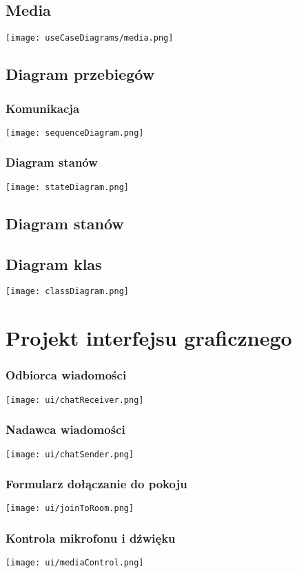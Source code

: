 \documentclass{article}
\begin{document}
\subsection{Media}
\texttt{[image: useCaseDiagrams/media.png]}

\subsection{Diagram przebiegów}
\subsubsection{Komunikacja}
\texttt{[image: sequenceDiagram.png]}

\subsubsection{Diagram stanów}
\texttt{[image: stateDiagram.png]}

\subsection{Diagram stanów}

\subsection{Diagram klas}
\texttt{[image: classDiagram.png]}

\section{Projekt interfejsu graficznego}

\subsubsection{Odbiorca wiadomości}
\texttt{[image: ui/chatReceiver.png]}

\subsubsection{Nadawca wiadomości}
\texttt{[image: ui/chatSender.png]}

\subsubsection{Formularz dołączanie do pokoju}
\texttt{[image: ui/joinToRoom.png]}

\subsubsection{Kontrola mikrofonu i dźwięku}
\texttt{[image: ui/mediaControl.png]}
\end{document}
